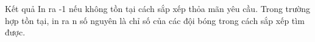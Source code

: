 Kết quả
In ra -1 nếu không tồn tại cách sắp xếp thỏa mãn yêu cầu. Trong trường hợp tồn tại, in ra n số nguyên là chỉ số của các đội bóng trong cách sắp xếp tìm được.